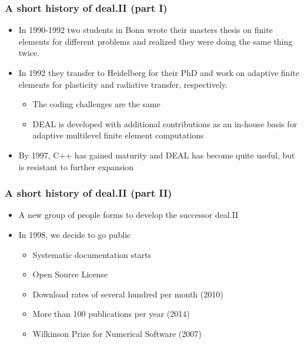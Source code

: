 \begin{frame}
  \frametitle{A short history of deal.II (part I)}
  \begin{itemize}
  \item<+-> In 1990-1992 two students in Bonn wrote their masters thesis
    on finite elements for different problems and realized they were
    doing the same thing twice.
  \item<+-> In 1992 they transfer to Heidelberg for their PhD and work on
    adaptive finite elements for plasticity and radiative transfer,
    respectively.
    \begin{itemize}
    \item The coding challenges are the same
    \item DEAL is developed with additional contributions as an
      in-house basis for adaptive multilevel finite element
      computations
    \end{itemize}
  \item<+-> By 1997, C++ has gained maturity and DEAL has become quite
    useful, but is resistant to further expansion
  \end{itemize}
\end{frame}

\begin{frame}
  \frametitle{A short history of deal.II (part II)}
  \begin{itemize}
  \item<+-> A new group of people forms to develop the successor deal.II
  \item<+-> In 1998, we decide to go public
    \begin{itemize}
    \item Systematic documentation starts
    \item Open Source License
    \item Download rates of several hundred per month (2010)
    \item More than 100 publications per year (2014)
    \item Wilkinson Prize for Numerical Software (2007)
    \end{itemize}
  \end{itemize}
\end{frame}

